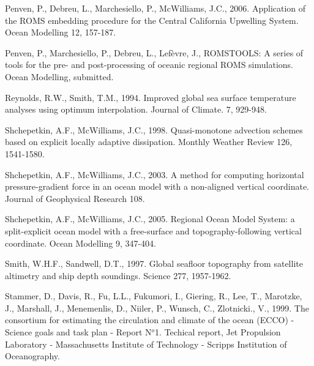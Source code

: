 Penven, P., Debreu, L., Marchesiello,  P., McWilliams, J.C.,
2006.
Application of the ROMS embedding procedure for the Central 
California Upwelling System.
Ocean Modelling
12, 157-187.

Penven, P.,  Marchesiello,  P., Debreu, L., Lef\`evre, J.,
ROMSTOOLS: A series of tools for the pre- and 
post-processing of oceanic regional ROMS simulations.
Ocean Modelling,
submitted.

Reynolds, R.W., Smith, T.M., 1994. 
Improved global sea surface temperature
analyses using optimum interpolation. 
Journal of Climate.
7, 929-948.

Shchepetkin, A.F., McWilliams, J.C.,
1998.
Quasi-monotone advection schemes based on explicit locally
adaptive dissipation.
Monthly Weather Review
126,
1541-1580.

Shchepetkin, A.F., McWilliams, J.C.,
2003.
A method for computing horizontal pressure-gradient force
in an ocean model with a non-aligned vertical coordinate.
Journal of Geophysical Research
108.

Shchepetkin, A.F., McWilliams, J.C.,
2005.
Regional Ocean Model System: a split-explicit ocean model with a
free-surface and topography-following vertical coordinate.
Ocean Modelling
9, 347-404.

Smith, W.H.F., Sandwell, D.T.,
1997.
Global seafloor topography from satellite altimetry and ship depth soundings.
Science
277,
1957-1962.

Stammer, D., Davis, R., Fu, L.L., Fukumori, I., Giering, R., Lee, T.,
Marotzke, J., Marshall, J., Menemenlis, D., Niiler, P., Wunsch, C.,
Zlotnicki., V., 1999. 
The consortium for estimating the circulation and
climate of the ocean ({ECCO}) - {Science goals} and task plan - {Report
N$^o$1}. 
Techical report, 
Jet Propulsion Laboratory - Massachusetts Institute of
 Technology - Scripps Institution of Oceanography.
